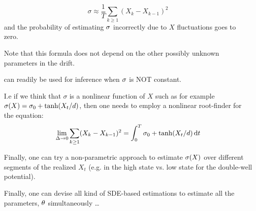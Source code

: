 \documentclass{article}
\begin{document}
\begin{equation}
\sigma \approx \frac 1T \sum_{k\geq 1} (X_k - X_{k-1})^2
\label{eq:sigma_est_quad_variation_sigma_constant}
\end{equation}
and the probability of estimating ${\sigma }$ incorrectly due to $X$ fluctuations goes
to zero.

Note that this formula does not depend on the other possibly unknown parameters
in the drift.
% 
 

 can readily be used for
inference when ${\sigma }$ is NOT constant.

I.e if we think that $\sigma$ is a nonlinear function of $X$ such as for example
${\sigma }(X) = {\sigma }_0 + \tanh(X_t/d)$, then one needs to employ a nonlinear root-finder 
for the equation:
$$
\lim_{\Delta {\rightarrow} 0} \sum_{k\geq 1} (X_k - X_{k-1})^2 = \int_0^T {\sigma }_0 +
\tanh(X_t/d) \, \mathrm{d} t 
$$

Finally, one can try a non-parametric approach to estimate ${\sigma }(X)$ over
different segments of the realized $X_t$ (e.g. in the high state vs. low state
for the double-well potential).

Finally, one can devise all kind of SDE-based estimations to estimate all the
parameters, ${\theta}$ simultaneously \ldots



 
 

\end{document}
